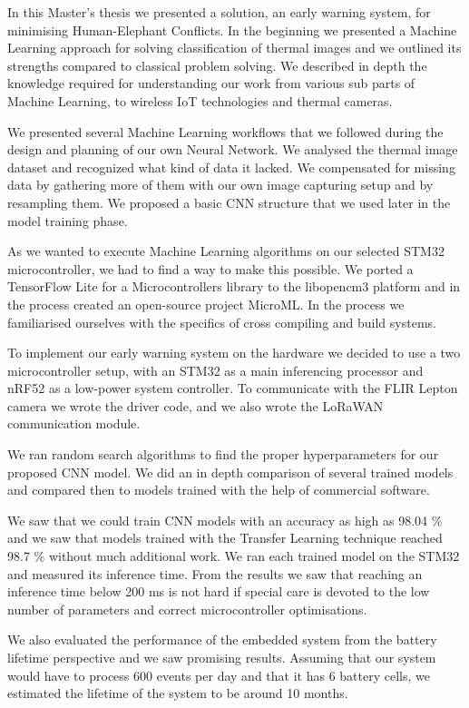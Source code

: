In this Master's thesis we presented a solution, an early warning system, for minimising Human-Elephant Conflicts.
In the beginning we presented a Machine Learning approach for solving classification of thermal images and we outlined its strengths compared to classical problem solving.
We described in depth the knowledge required for understanding our work from various sub parts of Machine Learning, to wireless IoT technologies and thermal cameras.

We presented several Machine Learning workflows that we followed during the design and planning of our own Neural Network.
We analysed the thermal image dataset and recognized what kind of data it lacked. 
We compensated for missing data by gathering more of them with our own image capturing setup and by resampling them.
We proposed a basic CNN structure that we used later in the model training phase.

As we wanted to execute Machine Learning algorithms on our selected STM32 microcontroller, we had to find a way to make this possible.
We ported a TensorFlow Lite for a Microcontrollers library to the libopencm3 platform and in the process created an open-source project MicroML.
In the process we familiarised ourselves with the specifics of cross compiling and build systems.

To implement our early warning system on the hardware we decided to use a two microcontroller setup, with an STM32 as a main inferencing processor and nRF52 as a low-power system controller.
To communicate with the FLIR Lepton camera we wrote the driver code, and we also wrote the LoRaWAN communication module.

We ran random search algorithms to find the proper hyperparameters for our proposed CNN model.
We did an in depth comparison of several trained models and compared then to models trained with the help of commercial software.

We saw that we could train CNN models with an accuracy as high as 98.04 \% and we saw that models trained with the Transfer Learning technique reached 98.7 \% without much additional work.
We ran each trained model on the STM32 and measured its inference time.
From the results we saw that reaching an inference time below 200 \si{\milli\second} is not hard if special care is devoted to the low number of parameters and correct microcontroller optimisations.

We also evaluated the performance of the embedded system from the battery lifetime perspective and we saw promising results.
Assuming that our system would have to process 600 events per day and that it has 6 battery cells, we estimated the lifetime of the system to be around 10 months.

